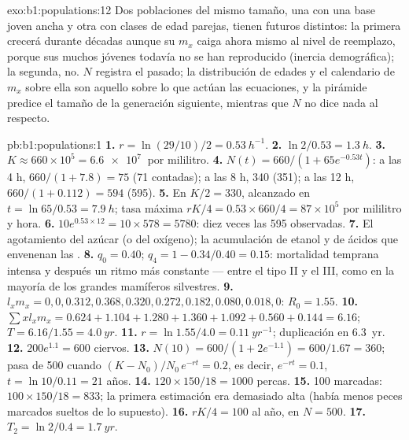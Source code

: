 \begin{solution}{exo:b1:populations:12}
Dos poblaciones del mismo tamaño, una con una base joven ancha y otra con
clases de edad parejas, tienen futuros distintos: la primera crecerá durante
décadas aunque su $m_x$ caiga ahora mismo al nivel de reemplazo, porque sus
muchos jóvenes todavía no se han reproducido (inercia demográfica); la
segunda, no. $N$ registra el pasado; la distribución de edades y el
calendario de $m_x$ sobre ella son aquello sobre lo que actúan las
ecuaciones, y la pirámide predice el tamaño de la generación siguiente,
mientras que $N$ no dice nada al respecto.
\end{solution}

\begin{solution}{pb:b1:populations:1}
\textbf{1.} $r = \ln(29/10)/2 = \qty{0.53}{h^{-1}}$.
\textbf{2.} $\ln 2/0.53 = \qty{1.3}{h}$.
\textbf{3.} $K \approx 660\times 10^5 = \qty{6.6e7}{}$  por
mililitro.
\textbf{4.} $N(t) = 660/(1 + 65e^{-0.53t})$: a las 4 h, $660/(1 + 7.8) =
75$ (71 contadas); a las 8 h, 340 (351); a las 12 h, $660/(1 + 0.112) = 594$
(595).
\textbf{5.} En $K/2 = 330$, alcanzado en $t = \ln 65/0.53 = \qty{7.9}{h}$;
tasa máxima $rK/4 = 0.53\times 660/4 = 87\times 10^5$  por
mililitro y hora.
\textbf{6.} $10e^{0.53\times 12} = 10\times 578 = 5780$: diez veces las 595
observadas.
\textbf{7.} El agotamiento del azúcar (o del oxígeno); la acumulación de
etanol y de ácidos que envenenan las .
\textbf{8.} $q_0 = 0.40$; $q_4 = 1 - 0.34/0.40 = 0.15$: mortalidad temprana
intensa y después un ritmo más constante --- entre el tipo II y el III, como
en la mayoría de los grandes mamíferos silvestres.
\textbf{9.} $l_x m_x = 0, 0, 0.312, 0.368, 0.320, 0.272, 0.182, 0.080,
0.018, 0$: $R_0 = 1.55$.
\textbf{10.} $\sum x l_x m_x = 0.624 + 1.104 + 1.280 + 1.360 + 1.092 +
0.560 + 0.144 = 6.16$; $T = 6.16/1.55 = \qty{4.0}{yr}$.
\textbf{11.} $r = \ln 1.55/4.0 = \qty{0.11}{yr^{-1}}$; duplicación en
\qty{6.3}{yr}.
\textbf{12.} $200e^{1.1} = 600$ ciervos.
\textbf{13.} $N(10) = 600/(1 + 2e^{-1.1}) = 600/1.67 = 360$; pasa de 500
cuando $(K - N_0)/N_0\,e^{-rt} = 0.2$, es decir, $e^{-rt} = 0.1$, $t = \ln
10/0.11 = 21$ años.
\textbf{14.} $120\times 150/18 = 1000$ percas.
\textbf{15.} 100 marcadas: $100\times 150/18 = 833$; la primera estimación
era demasiado alta (había menos peces marcados sueltos de lo supuesto).
\textbf{16.} $rK/4 = 100$ al año, en $N = 500$.
\textbf{17.} $T_2 = \ln 2/0.4 = \qty{1.7}{yr}$.

\end{solution}
